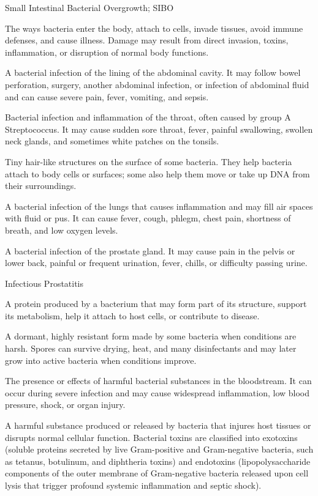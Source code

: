 \synonyms
Small Intestinal Bacterial Overgrowth; SIBO

 The ways bacteria enter the body, attach to cells, invade tissues, avoid immune defenses, and cause illness. Damage may result from direct invasion, toxins, inflammation, or disruption of normal body functions.

 A bacterial infection of the lining of the abdominal cavity. It may follow bowel perforation, surgery, another abdominal infection, or infection of abdominal fluid and can cause severe pain, fever, vomiting, and sepsis.

 Bacterial infection and inflammation of the throat, often caused by group A Streptococcus. It may cause sudden sore throat, fever, painful swallowing, swollen neck glands, and sometimes white patches on the tonsils.

 Tiny hair-like structures on the surface of some bacteria. They help bacteria attach to body cells or surfaces; some also help them move or take up DNA from their surroundings.

 A bacterial infection of the lungs that causes inflammation and may fill air spaces with fluid or pus. It can cause fever, cough, phlegm, chest pain, shortness of breath, and low oxygen levels.

 A bacterial infection of the prostate gland. It may cause pain in the pelvis or lower back, painful or frequent urination, fever, chills, or difficulty passing urine.

\synonyms
Infectious Prostatitis

 A protein produced by a bacterium that may form part of its structure, support its metabolism, help it attach to host cells, or contribute to disease.

 A dormant, highly resistant form made by some bacteria when conditions are harsh. Spores can survive drying, heat, and many disinfectants and may later grow into active bacteria when conditions improve.

 The presence or effects of harmful bacterial substances in the bloodstream. It can occur during severe infection and may cause widespread inflammation, low blood pressure, shock, or organ injury.

 A harmful substance produced or released by bacteria that injures host tissues or disrupts normal cellular function. Bacterial toxins are classified into exotoxins (soluble proteins secreted by live Gram-positive and Gram-negative bacteria, such as tetanus, botulinum, and diphtheria toxins) and endotoxins (lipopolysaccharide components of the outer membrane of Gram-negative bacteria released upon cell lysis that trigger profound systemic inflammation and septic shock).

